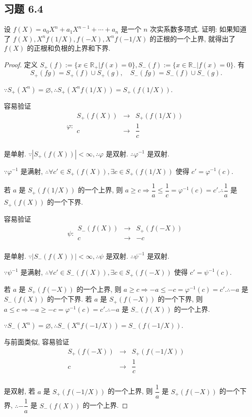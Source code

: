 \documentclass[color=black,device=normal,lang=cn,mode=geye]{elegantnote}
\begin{document}
\subsection{习题 6.4}
\addtocounter{exsection}{1}
\begin{exercise}\label{ex4.1}
    设 $f(X)=a_0X^n+a_1X^{n-1}+\cdots+a_n$ 是一个 $n$ 次实系数多项式. 证明: 如果知道了 $f(X),X^nf(1/X),f(-X),X^nf(-1/X)$ 的正根的一个上界, 就得出了 $f(X)$ 的正根和负根的上界和下界.
\end{exercise}
\begin{proof}
    定义 $S_+(f):=\{x\in\mathbb{R}_+|f(x)=0\},S_-(f):=\{x\in\mathbb{R}_-|f(x)=0\}$. 有
    \[S_+(fg)=S_+(f)\cup S_+(g),\quad S_-(fg)=S_-(f)\cup S_-(g).\]

    $\because S_+(X^n)=\varnothing,\therefore S_+(X^nf(1/X))=S_+(f(1/X))$.

    容易验证
    \[\varphi:\begin{array}{rcl}
        S_+(f(X)) & \to & S_+(f(1/X)) \\
        c & \to & \dfrac{1}{c} \\
    \end{array}\]
    
    是单射. $\because|S_+(f(X))|<\infty,\therefore\varphi$ 是双射. $\therefore\varphi^{-1}$ 是双射.

    $\because\varphi^{-1}$ 是满射, $\therefore\forall c'\in S_+(f(X)),\exists c\in S_+(f(1/X))$ 使得 $c'=\varphi^{-1}(c)$.

    若 $a$ 是 $S_+(f(1/X))$ 的一个上界, 则 $a\geq c\Rightarrow\dfrac{1}{a}\leq\dfrac{1}{c}=\varphi^{-1}(c)=c'.\therefore\dfrac{1}{a}$ 是 $S_+(f(X))$ 的一个下界.

    容易验证
    \[\psi:\begin{array}{rcl}
        S_-(f(X)) & \to & S_+(f(-X)) \\
        c & \to & -c \\
    \end{array}\]
    
    是单射. $\because|S_-(f(X))|<\infty,\therefore\psi$ 是双射. $\therefore\psi^{-1}$ 是双射.

    $\because\psi^{-1}$ 是满射, $\therefore\forall c'\in S_-(f(X)),\exists c\in S_+(f(-X))$ 使得 $c'=\psi^{-1}(c)$.

    若 $a$ 是 $S_+(f(-X))$ 的一个上界, 则 $a\geq c\Rightarrow-a\leq-c=\varphi^{-1}(c)=c'.\therefore-a$ 是 $S_-(f(X))$ 的一个下界. 若 $a$ 是 $S_+(f(-X))$ 的一个下界, 则 $a\leq c\Rightarrow-a\geq-c=\varphi^{-1}(c)=c'.\therefore-a$ 是 $S_-(f(X))$ 的一个上界.

    $\because S_-(X^n)=\varnothing,\therefore S_-(X^nf(-1/X))=S_-(f(-1/X))$.

    与前面类似, 容易验证
    \[\begin{array}{rcl}
        S_+(f(-X)) & \to & S_+(f(-1/X)) \\
        c & \to & \dfrac{1}{c} \\
    \end{array}\]

    是双射, 若 $a$ 是 $S_+(f(-1/X))$ 的一个上界, 则 $\dfrac{1}{a}$ 是 $S_+(f(-X))$ 的一个下界, $\therefore-\dfrac{1}{a}$ 是 $S_-(f(X))$ 的一个上界.
\end{proof}
\end{document}
